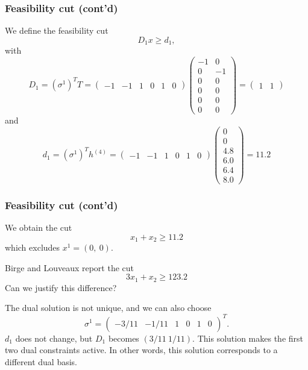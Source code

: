 \documentclass[aspectratio=169]{beamer}
\begin{document}
\begin{frame}
	\frametitle{Feasibility cut (cont'd)}
	
	\small
	We define the feasibility cut
	\[
	D_1 x \geq d_1,
	\]
	with
	\[
	D_1 = (\sigma^1)^T T
	= \begin{pmatrix} -1 & -1 & 1 & 0 & 1 & 0 \end{pmatrix}
	\begin{pmatrix}
	-1 &  0 \\
	0 & -1 \\
	0 &  0 \\
	0 &  0 \\
	0 &  0 \\
	0 &  0
	\end{pmatrix}
	= \begin{pmatrix} 1 & 1 \end{pmatrix}
	\]
	and
	\[
	d_1 = (\sigma^1)^T h^{(4)}
	= \begin{pmatrix} -1 & -1 & 1 & 0 & 1 & 0 \end{pmatrix}
	\begin{pmatrix} 0 \\ 0 \\ 4.8 \\ 6.0 \\ 6.4 \\ 8.0 \end{pmatrix} = 11.2
	\]
	
\end{frame}

\begin{frame}
	\frametitle{Feasibility cut (cont'd)}
	
	We obtain the cut
	\[
	x_1 + x_2 \geq 11.2
	\]
	which excludes $x^1 = (0,\ 0)$.
	
	\mbox{}
	
	Birge and Louveaux report the cut
	\[
	3x_1 + x_2 \geq 123.2
	\]
	Can we justify this difference?
	
	\mbox{}
	
	The dual solution is not unique, and we can also choose
	\[
	\sigma^1 = \begin{pmatrix} -3/11 & -1/11 & 1 & 0 & 1 & 0 \end{pmatrix}^T.
	\]
	$d_1$ does not change, but $D_1$ becomes $(3/11 \ 1/11)$.
	This solution makes the first two dual constraints active. In other words, this solution corresponds to a different dual basis.
	
\end{frame}
\end{document}
